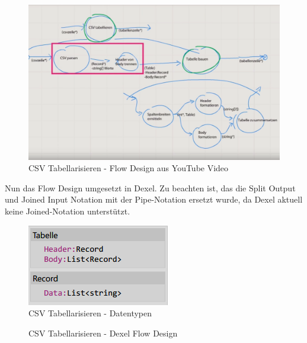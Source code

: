 \begin{figure}[H]
	\centering
	\includegraphics[width=1\linewidth]{./img/youtubeflowdesign.png}
	\caption{CSV Tabellarisieren - Flow Design aus YouTube Video}
\end{figure}


Nun das Flow Design umgesetzt in Dexel. Zu beachten ist, das die Split Output und Joined Input Notation mit der Pipe-Notation ersetzt wurde, da Dexel aktuell keine Joined-Notation unterstützt.


\begin{figure}[H]
	\centering
	\includegraphics[width=0.4\linewidth]{./img/csvtabellierenDexelDataTypes.png}
	\caption{CSV Tabellarisieren - Datentypen}
\end{figure}




\begin{landscape}
\begin{figure}
	\thispagestyle{empty}

	\caption{CSV Tabellarisieren - Dexel Flow Design}
\end{figure}
\end{landscape}






